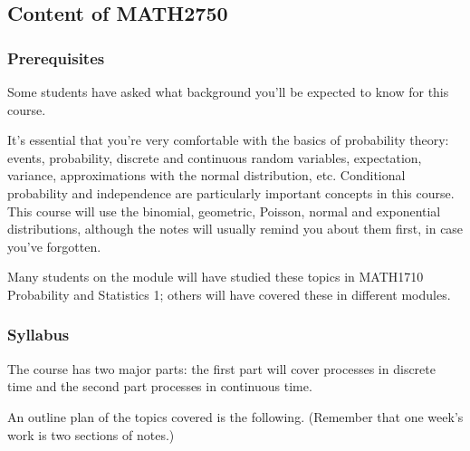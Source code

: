 \documentclass[
  a4paper,
]{article}
\theoremstyle{definition}
\theoremstyle{definition}
\theoremstyle{definition}
\theoremstyle{remark}
\begin{document}
\hypertarget{about-content}{%
\subsection*{Content of MATH2750}\label{about-content}}

\hypertarget{prereqs}{%
\subsubsection*{Prerequisites}\label{prereqs}}

Some students have asked what background you'll be expected to know for this course.

It's essential that you're very comfortable with the basics of probability theory: events, probability, discrete and continuous random variables, expectation, variance, approximations with the normal distribution, etc. Conditional probability and independence are particularly important concepts in this course. This course will use the binomial, geometric, Poisson, normal and exponential distributions, although the notes will usually remind you about them first, in case you've forgotten.

Many students on the module will have studied these topics in MATH1710 Probability and Statistics 1; others will have covered these in different modules.

\hypertarget{syllabus}{%
\subsubsection*{Syllabus}\label{syllabus}}

The course has two major parts: the first part will cover processes in discrete time and the second part processes in continuous time.

An outline plan of the topics covered is the following. (Remember that one week's work is two sections of notes.)
\end{document}
